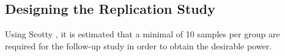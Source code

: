 %
%
%
%

\subsection{Designing the Replication Study}
Using Scotty \citep{Busby2013}, it is estimated that a minimal of 10 samples per group are required for the follow-up study in order to obtain the desirable power. 

